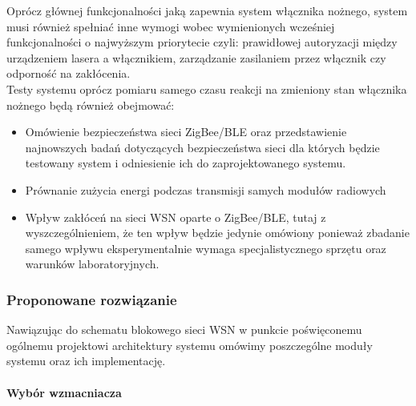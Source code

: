 Oprócz głównej funkcjonalności jaką zapewnia system włącznika nożnego, system musi również spełniać inne wymogi wobec wymienionych wcześniej funkcjonalności o najwyższym priorytecie czyli: prawidłowej autoryzacji między urządzeniem lasera a włącznikiem, zarządzanie zasilaniem przez włącznik czy odporność na zakłócenia. \\
Testy systemu oprócz pomiaru samego czasu reakcji na zmieniony stan włącznika nożnego będą również obejmować: 
\begin{itemize}
    	\item Omówienie bezpieczeństwa sieci ZigBee/BLE oraz przedstawienie najnowszych badań dotyczących bezpieczeństwa sieci dla których będzie testowany system i odniesienie ich do zaprojektowanego systemu.
        \item Prównanie zużycia energi podczas transmisji samych modułów radiowych
        \item Wpływ zakłóceń na sieci WSN oparte o ZigBee/BLE, tutaj z wyszczególnieniem, że ten wpływ będzie jedynie omówiony ponieważ zbadanie samego wpływu eksperymentalnie wymaga specjalistycznego sprzętu oraz warunków laboratoryjnych.
    \end{itemize}

\subsubsection{Proponowane rozwiązanie}

\tab Nawiązując do schematu blokowego sieci WSN w punkcie poświęconemu ogólnemu projektowi architektury systemu omówimy poszczególne moduły systemu oraz ich implementację.\\

\paragraph{Wybór wzmacniacza}

